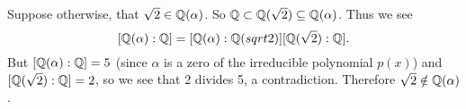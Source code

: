 \begin{questions}
\begin{partquestions}{\alph*}
\begin{partquestions}{\roman*}
            \item Suppose otherwise, that $\sqrt2 \in \mathbb{Q}(\alpha)$. So $\mathbb{Q} \subset \mathbb{Q}(\sqrt2) \subseteq \mathbb{Q}(\alpha)$. Thus we see
            \[
                [\mathbb{Q}(\alpha): \mathbb{Q}] = [\mathbb{Q}(\alpha):\mathbb{Q}(sqrt2)][\mathbb{Q}(\sqrt2):\mathbb{Q}].
            \]
            But $[\mathbb{Q}(\alpha): \mathbb{Q}] = 5$ (since $\alpha$ is a zero of the irreducible polynomial $p(x)$) and $[\mathbb{Q}(\sqrt2):\mathbb{Q}] = 2$, so we see that 2 divides 5, a contradiction. Therefore $\sqrt2 \notin \mathbb{Q}(\alpha)$.
        \end{partquestions}
    \end{partquestions}
\end{questions}
